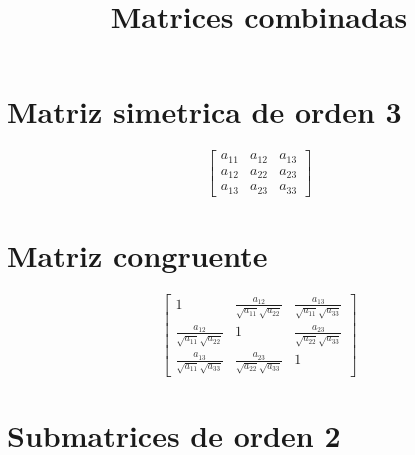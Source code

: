 \documentclass[12pt]{article}
\begin{document}
\title{Matrices combinadas}
\maketitle

\section*{Matriz simetrica de orden 3}

$$\left[\begin{matrix}a_{11} & a_{12} & a_{13}\\a_{12} & a_{22} & a_{23}\\a_{13} & a_{23} & a_{33}\end{matrix}\right]$$

\section*{Matriz congruente}

$$\left[\begin{matrix}1 & \frac{a_{12}}{\sqrt{a_{11}} \sqrt{a_{22}}} & \frac{a_{13}}{\sqrt{a_{11}} \sqrt{a_{33}}}\\\frac{a_{12}}{\sqrt{a_{11}} \sqrt{a_{22}}} & 1 & \frac{a_{23}}{\sqrt{a_{22}} \sqrt{a_{33}}}\\\frac{a_{13}}{\sqrt{a_{11}} \sqrt{a_{33}}} & \frac{a_{23}}{\sqrt{a_{22}} \sqrt{a_{33}}} & 1\end{matrix}\right]$$

\section*{Submatrices de orden 2}
\end{document}
